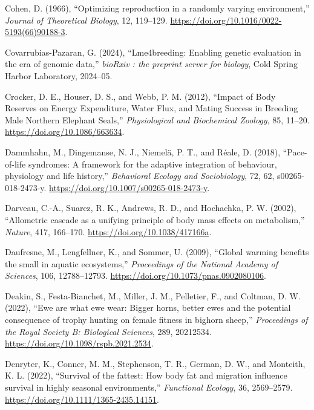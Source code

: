\documentclass[
  12pt,
  letterpaper,
]{scrartcl}
\newlength{\cslhangindent}
\newenvironment{CSLReferences}[2] %
 {\begin{list}{}{%
  \setlength{\itemindent}{0pt}
  \setlength{\leftmargin}{0pt}
  \setlength{\parsep}{0pt}
  \ifodd #1
   \setlength{\leftmargin}{\cslhangindent}
   \setlength{\itemindent}{-1\cslhangindent}
  \fi
  \setlength{\itemsep}{#2\baselineskip}}}
 {\end{list}}
\begin{document}
\begin{CSLReferences}{1}{0}
Cohen, D. (1966), {``Optimizing reproduction in a randomly varying
environment,''} \emph{Journal of Theoretical Biology}, 12, 119--129.
\url{https://doi.org/10.1016/0022-5193(66)90188-3}.

Covarrubias-Pazaran, G. (2024), {``Lme4breeding: Enabling genetic
evaluation in the era of genomic data,''} \emph{bioRxiv : the preprint
server for biology}, Cold Spring Harbor Laboratory, 2024--05.

Crocker, D. E., Houser, D. S., and Webb, P. M. (2012), {``Impact of
{Body Reserves} on {Energy Expenditure}, {Water Flux}, and {Mating
Success} in {Breeding Male Northern Elephant Seals},''}
\emph{Physiological and Biochemical Zoology}, 85, 11--20.
\url{https://doi.org/10.1086/663634}.

Dammhahn, M., Dingemanse, N. J., Niemelä, P. T., and Réale, D. (2018),
{``Pace-of-life syndromes: A framework for the adaptive integration of
behaviour, physiology and life history,''} \emph{Behavioral Ecology and
Sociobiology}, 72, 62, s00265-018-2473-y.
\url{https://doi.org/10.1007/s00265-018-2473-y}.

Darveau, C.-A., Suarez, R. K., Andrews, R. D., and Hochachka, P. W.
(2002), {``Allometric cascade as a unifying principle of body mass
effects on metabolism,''} \emph{Nature}, 417, 166--170.
\url{https://doi.org/10.1038/417166a}.

Daufresne, M., Lengfellner, K., and Sommer, U. (2009), {``Global warming
benefits the small in aquatic ecosystems,''} \emph{Proceedings of the
National Academy of Sciences}, 106, 12788--12793.
\url{https://doi.org/10.1073/pnas.0902080106}.

Deakin, S., Festa-Bianchet, M., Miller, J. M., Pelletier, F., and
Coltman, D. W. (2022), {``Ewe are what ewe wear: {Bigger} horns, better
ewes and the potential consequence of trophy hunting on female fitness
in bighorn sheep,''} \emph{Proceedings of the Royal Society B:
Biological Sciences}, 289, 20212534.
\url{https://doi.org/10.1098/rspb.2021.2534}.

Denryter, K., Conner, M. M., Stephenson, T. R., German, D. W., and
Monteith, K. L. (2022), {``Survival of the fattest: {How} body fat and
migration influence survival in highly seasonal environments,''}
\emph{Functional Ecology}, 36, 2569--2579.
\url{https://doi.org/10.1111/1365-2435.14151}.


\end{CSLReferences}
\end{document}
